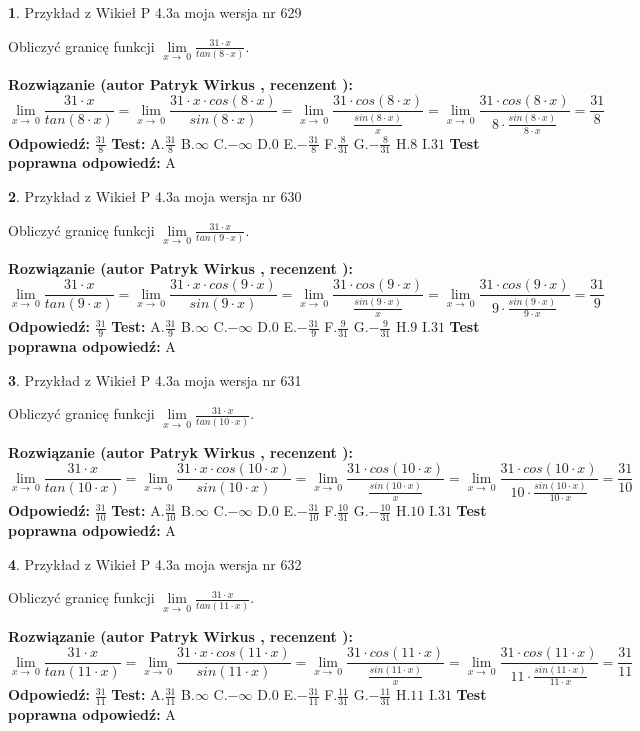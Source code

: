 \documentclass[12pt, a4paper]{article}
\theoremstyle{definition} %
\newtheorem{zad}{}
\newcommand{\zadStart}[1]{\begin{zad}#1\newline}
\newcommand{\zadStop}{\end{zad}}
\newcommand{\rozwStart}[2]{\noindent \textbf{Rozwiązanie (autor #1 , recenzent #2): }\newline}
\newcommand{\rozwStop}{\newline}
\newcommand{\odpStart}{\noindent \textbf{Odpowiedź:}\newline}
\newcommand{\odpStop}{\newline}
\newcommand{\testStart}{\noindent \textbf{Test:}\newline}
\newcommand{\testStop}{\newline}
\newcommand{\kluczStart}{\noindent \textbf{Test poprawna odpowiedź:}\newline}
\newcommand{\kluczStop}{\newline}
\begin{document}
\zadStart{Przykład z Wikieł P 4.3a moja wersja nr 629}


Obliczyć granicę funkcji $\lim\limits_{x\to\ 0}\frac{31 \cdot x}{tan(8 \cdot x)}$.
\zadStop
\rozwStart{Patryk Wirkus}{}
$$\lim\limits_{x\to\ 0}\frac{31 \cdot x}{tan(8 \cdot x)}=\lim\limits_{x\to\ 0}\frac{31 \cdot x \cdot cos(8 \cdot x)}{sin(8 \cdot x)}=\lim\limits_{x\to\ 0}\frac{31 \cdot cos(8 \cdot x)}{\frac{sin(8 \cdot x)}{x}}=\lim\limits_{x\to\ 0}\frac{31 \cdot cos(8 \cdot x)}{8 \cdot \frac{sin(8 \cdot x)}{8 \cdot x}} = \frac{31}{8}$$
\rozwStop
\odpStart
$\frac{31}{8}$
\odpStop
\testStart
A.$\frac{31}{8}$
B.$\infty$
C.$-\infty$
D.$0$
E.$-\frac{31}{8}$
F.$\frac{8}{31}$
G.$-\frac{8}{31}$
H.$8$
I.$31$
\testStop
\kluczStart
A
\kluczStop



\zadStart{Przykład z Wikieł P 4.3a moja wersja nr 630}


Obliczyć granicę funkcji $\lim\limits_{x\to\ 0}\frac{31 \cdot x}{tan(9 \cdot x)}$.
\zadStop
\rozwStart{Patryk Wirkus}{}
$$\lim\limits_{x\to\ 0}\frac{31 \cdot x}{tan(9 \cdot x)}=\lim\limits_{x\to\ 0}\frac{31 \cdot x \cdot cos(9 \cdot x)}{sin(9 \cdot x)}=\lim\limits_{x\to\ 0}\frac{31 \cdot cos(9 \cdot x)}{\frac{sin(9 \cdot x)}{x}}=\lim\limits_{x\to\ 0}\frac{31 \cdot cos(9 \cdot x)}{9 \cdot \frac{sin(9 \cdot x)}{9 \cdot x}} = \frac{31}{9}$$
\rozwStop
\odpStart
$\frac{31}{9}$
\odpStop
\testStart
A.$\frac{31}{9}$
B.$\infty$
C.$-\infty$
D.$0$
E.$-\frac{31}{9}$
F.$\frac{9}{31}$
G.$-\frac{9}{31}$
H.$9$
I.$31$
\testStop
\kluczStart
A
\kluczStop



\zadStart{Przykład z Wikieł P 4.3a moja wersja nr 631}


Obliczyć granicę funkcji $\lim\limits_{x\to\ 0}\frac{31 \cdot x}{tan(10 \cdot x)}$.
\zadStop
\rozwStart{Patryk Wirkus}{}
$$\lim\limits_{x\to\ 0}\frac{31 \cdot x}{tan(10 \cdot x)}=\lim\limits_{x\to\ 0}\frac{31 \cdot x \cdot cos(10 \cdot x)}{sin(10 \cdot x)}=\lim\limits_{x\to\ 0}\frac{31 \cdot cos(10 \cdot x)}{\frac{sin(10 \cdot x)}{x}}=\lim\limits_{x\to\ 0}\frac{31 \cdot cos(10 \cdot x)}{10 \cdot \frac{sin(10 \cdot x)}{10 \cdot x}} = \frac{31}{10}$$
\rozwStop
\odpStart
$\frac{31}{10}$
\odpStop
\testStart
A.$\frac{31}{10}$
B.$\infty$
C.$-\infty$
D.$0$
E.$-\frac{31}{10}$
F.$\frac{10}{31}$
G.$-\frac{10}{31}$
H.$10$
I.$31$
\testStop
\kluczStart
A
\kluczStop



\zadStart{Przykład z Wikieł P 4.3a moja wersja nr 632}


Obliczyć granicę funkcji $\lim\limits_{x\to\ 0}\frac{31 \cdot x}{tan(11 \cdot x)}$.
\zadStop
\rozwStart{Patryk Wirkus}{}
$$\lim\limits_{x\to\ 0}\frac{31 \cdot x}{tan(11 \cdot x)}=\lim\limits_{x\to\ 0}\frac{31 \cdot x \cdot cos(11 \cdot x)}{sin(11 \cdot x)}=\lim\limits_{x\to\ 0}\frac{31 \cdot cos(11 \cdot x)}{\frac{sin(11 \cdot x)}{x}}=\lim\limits_{x\to\ 0}\frac{31 \cdot cos(11 \cdot x)}{11 \cdot \frac{sin(11 \cdot x)}{11 \cdot x}} = \frac{31}{11}$$
\rozwStop
\odpStart
$\frac{31}{11}$
\odpStop
\testStart
A.$\frac{31}{11}$
B.$\infty$
C.$-\infty$
D.$0$
E.$-\frac{31}{11}$
F.$\frac{11}{31}$
G.$-\frac{11}{31}$
H.$11$
I.$31$
\testStop
\kluczStart
A
\kluczStop
\end{document}
